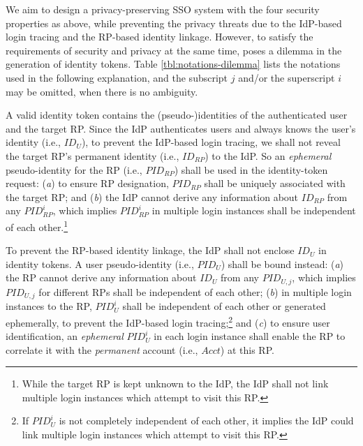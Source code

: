 We aim to design a privacy-preserving SSO system with the four security properties as above,
    while preventing the privacy threats due to the IdP-based login tracing and the RP-based identity linkage.
However, to satisfy the requirements of security and privacy at the same time,
     poses a dilemma in the generation of identity tokens.
Table \ref{tbl:notations-dilemma} lists the notations used in the following explanation,
    and the subscript $j$ and/or the superscript $i$ may be omitted, when there is no ambiguity.

A valid identity token contains the (pseudo-)identities of the authenticated user and the target RP. %
Since the IdP authenticates users and always knows the user's identity (i.e., $ID_U$),
    to prevent the IdP-based login tracing,
    we shall not reveal the target RP's permanent identity (i.e., $ID_{RP}$) to the IdP.
So an \emph{ephemeral} pseudo-identity for the RP (i.e., $PID_{RP}$) shall be used in the identity-token request:
(\emph{a}) to ensure RP designation,
     $PID_{RP}$ shall be uniquely associated with the target RP;
    and (\emph{b}) the IdP cannot derive any information about $ID_{RP}$ from any $PID_{RP}^i$,
        which implies $PID_{RP}^i$ in multiple login instances shall
         be independent of each other.\footnote{While the target RP is kept unknown to the IdP,
            the IdP shall not link multiple login instances which attempt to visit this RP.}

To prevent the RP-based identity linkage,
 the IdP shall not enclose $ID_U$ in identity tokens.
A user pseudo-identity (i.e., $PID_U$) shall be bound instead:
    (\emph{a}) the RP cannot derive any information about $ID_U$ from any $PID_{U,j}$,
    which implies $PID_{U,j}$ for different RPs shall be independent of each other;
    (\emph{b}) in multiple login instances to the RP, $PID_U^i$ shall be independent of each other or generated ephemerally,
        to prevent the IdP-based login tracing;\footnote{If $PID_U^i$ is not completely independent of each other,
         it implies the IdP could link multiple login instances which attempt to visit this RP.}
    and (\emph{c}) to ensure user identification,
    an \emph{ephemeral} $PID_{U}^i$ in each login instance shall enable the RP to correlate it
     with the \emph{permanent} account  (i.e., $Acct$) at this RP.


